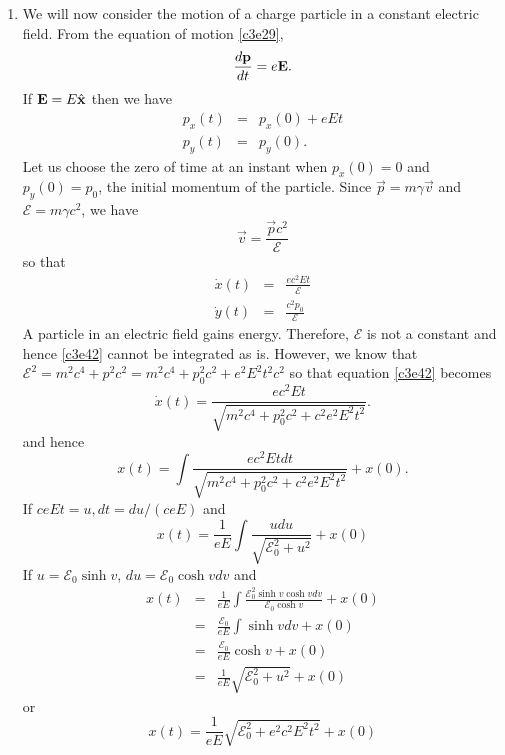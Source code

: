 \begin{enumerate}
\item We will now consider the motion of a charge particle in a constant electric
field. From the equation of motion \eqref{c3e29},
\begin{equation}\label{c3e38}
\frac{d{\mathbf{p}}}{d{t}} = e\mathbf{E}.
\end{equation}
If $\mathbf{E} = E\hat{\mathbf{x}}$ then we have
\begin{eqnarray}
p_x(t) &=& p_x(0) + eEt \label{c3e39} \\
p_y(t) &=& p_y(0) \label{c3e40}.
\end{eqnarray}
Let us choose the zero of time at an instant when $p_x(0) = 0$ and $p_y(0) = p_0$,
the initial momentum of the particle. Since $\vec{p} = m\gamma\vec{v}$ and 
$\mathcal{E} = m\gamma c^2$, we have 
\begin{equation}\label{c3e41}
\vec{v} = \frac{\vec{p}c^2}{\mathcal{E}}
\end{equation}
so that
\begin{eqnarray}
\dot{x}(t) &=& \frac{ec^2Et}{\mathcal{E}} \label{c3e42} \\
\dot{y}(t) &=& \frac{c^2p_0}{\mathcal{E}} \label{c3e43}
\end{eqnarray}
A particle in an electric field gains energy. Therefore, $\mathcal{E}$ is not a
constant and hence \eqref{c3e42} cannot be integrated as is. However, we know 
that $\mathcal{E}^2 = m^2c^4 + p^2c^2 = m^2c^4 + p_0^2c^2 + e^2E^2t^2c^2$ so that
equation \eqref{c3e42} becomes
\begin{equation}\label{c3e44}
\dot{x}(t) = \frac{ec^2Et}{\sqrt{m^2c^4 + p_0^2c^2 + c^2e^2E^2t^2}}.
\end{equation}
and hence
\[
x(t) = \int \frac{ec^2Et dt}{\sqrt{m^2c^4 + p_0^2c^2 + c^2e^2E^2t^2}} + x(0).
\]
If $ceEt = u, dt = du/(ceE)$ and
\[
x(t) = \frac{1}{eE}\int\frac{u du}{\sqrt{\mathcal{E}_0^2 + u^2}} + x(0)
\]
If $u = \mathcal{E}_0\sinh v$, $du = \mathcal{E}_0\cosh  vdv$ and
\begin{eqnarray*}
x(t) &=& \frac{1}{eE}\int\frac{\mathcal{E}_0^2\sinh v\cosh v dv}{\mathcal{E}_0\cosh v} + x(0) \\
 &=& \frac{\mathcal{E}_0}{eE}\int\sinh v dv + x(0) \\
 &=& \frac{\mathcal{E}_0}{eE}\cosh v + x(0) \\
 &=& \frac{1}{eE}\sqrt{\mathcal{E}_0^2 + u^2} + x(0)
\end{eqnarray*}
or
\begin{equation}\label{c3e45}
x(t) = \frac{1}{eE}\sqrt{\mathcal{E}_0^2 + e^2c^2E^2t^2} + x(0)
\end{equation}

\end{enumerate}
